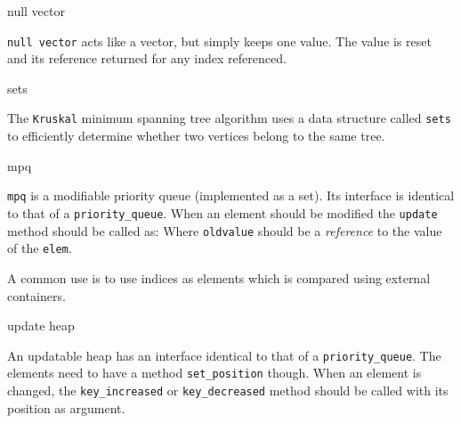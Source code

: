 \categorycontents{}

\begin{algorithm}{null vector}

{\tt null vector} acts like a vector, but simply keeps one value.
The value is reset and its reference returned for any index referenced.
\end{algorithm}


\begin{algorithm}{sets}

The {\tt Kruskal} minimum spanning tree algorithm uses a data structure
called {\tt sets} to efficiently determine whether two vertices belong to
the same tree.
\end{algorithm}


\begin{algorithm}{mpq}

{\tt mpq} is a modifiable priority queue (implemented as a set). Its interface
is identical to that of a {\tt priority\_queue}. When an element should be
modified the {\tt update} method should be called as:
Where {\tt oldvalue} should be a \emph{reference} to the value of the
{\tt elem}.

A common use is to use indices as elements which is compared using external
containers.
\end{algorithm}


\begin{algorithm}{update heap}

An updatable heap has an interface identical to that of a
{\tt priority\_queue}.
The elements need to have a method {\tt set\_position} though. When an element
is changed, the {\tt key\_increased} or {\tt key\_decreased} method should
be called with its position as argument.
\end{algorithm}

\begin{sourceslandscape}
\end{sourceslandscape}
